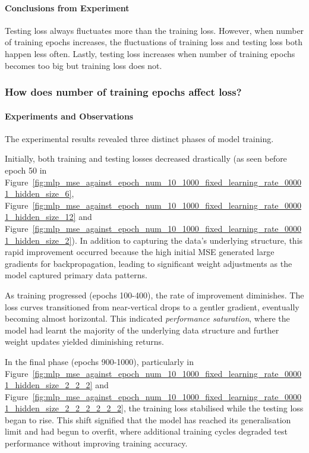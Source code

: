 \documentclass{article}
\begin{document}
\paragraph{Conclusions from Experiment}
Testing loss always fluctuates more than the training loss. However, when number of training epochs increases, the fluctuations of training loss and testing loss both happen less often. Lastly, testing loss increases when number of training epochs becomes too big but training loss does not. 


\subsubsection{How does number of training epochs affect loss? }
\paragraph{Experiments and Observations}
The experimental results revealed three distinct phases of model training. 

Initially, both training and testing losses decreased drastically (as seen before epoch 50 in Figure~\ref{fig:mlp_mse_against_epoch_num_10_1000_fixed_learning_rate_00001_hidden_size_6}, Figure~\ref{fig:mlp_mse_against_epoch_num_10_1000_fixed_learning_rate_00001_hidden_size_12} and Figure~\ref{fig:mlp_mse_against_epoch_num_10_1000_fixed_learning_rate_00001_hidden_size_2}). In addition to capturing the data's underlying structure, this rapid improvement occurred because the high initial MSE generated large gradients for backpropagation, leading to significant weight adjustments as the model captured primary data patterns. 

As training progressed (epochs 100-400), the rate of improvement diminishes. The loss curves transitioned from near-vertical drops to a gentler gradient, eventually becoming almost horizontal. This indicated \textit{performance saturation}, where the model had learnt the majority of the underlying data structure and further weight updates yielded diminishing returns. 

In the final phase (epochs 900-1000), particularly in Figure~\ref{fig:mlp_mse_against_epoch_num_10_1000_fixed_learning_rate_00001_hidden_size_2_2_2} and Figure~\ref{fig:mlp_mse_against_epoch_num_10_1000_fixed_learning_rate_00001_hidden_size_2_2_2_2_2_2}, the training loss stabilised while the testing loss began to rise. This shift signified that the model has reached its generalisation limit and had begun to overfit, where additional training cycles degraded test performance without improving training accuracy. 
\end{document}
